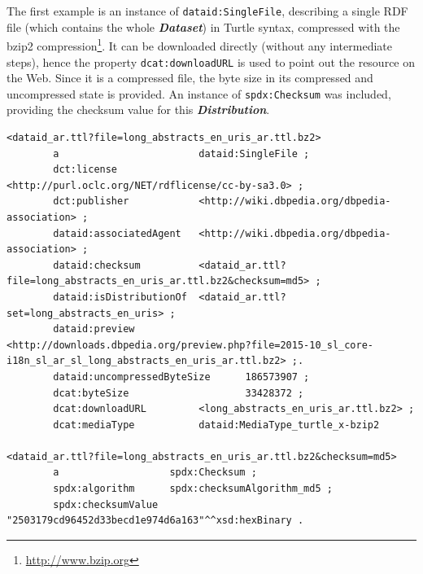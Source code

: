 \documentclass[a4paper,english,twoside,BCOR1.5cm,headsepline,DIV12,appendixprefix,final,12pt]{scrbook}
\newcommand{\prop}[1]{{{\texttt{#1}}}}
\newcommand{\important}[1]{\textbf{\textit{#1}}}
\newcommand\footnoteurl[1]{\footnote{\scriptsize\url{#1}}}
\begin{document}
The first example is an instance of \prop{dataid:SingleFile}, describing a single RDF file (which contains the whole \important{Dataset}) in Turtle syntax, compressed with the bzip2 compression\footnoteurl{http://www.bzip.org}. It can be downloaded directly (without any intermediate steps), hence the property \prop{dcat:downloadURL} is used to point out the resource on the Web. Since it is a compressed file, the byte size in its compressed and uncompressed state is provided. An instance of \prop{spdx:Checksum} was included, providing the checksum value for this \important{Distribution}.
\\
\begin{lstlisting}[language=ttl, captionpos=b,caption=A single file Distribution,label=lst:coresuperset,linewidth=\columnwidth,breaklines=true]
<dataid_ar.ttl?file=long_abstracts_en_uris_ar.ttl.bz2>
        a                        dataid:SingleFile ;
        dct:license              <http://purl.oclc.org/NET/rdflicense/cc-by-sa3.0> ;                              
        dct:publisher            <http://wiki.dbpedia.org/dbpedia-association> ;
        dataid:associatedAgent   <http://wiki.dbpedia.org/dbpedia-association> ;
        dataid:checksum          <dataid_ar.ttl?file=long_abstracts_en_uris_ar.ttl.bz2&checksum=md5> ;            
        dataid:isDistributionOf  <dataid_ar.ttl?set=long_abstracts_en_uris> ;                                     
        dataid:preview           <http://downloads.dbpedia.org/preview.php?file=2015-10_sl_core-i18n_sl_ar_sl_long_abstracts_en_uris_ar.ttl.bz2> ;.
        dataid:uncompressedByteSize      186573907 ;                                                              
        dcat:byteSize                    33428372 ;                                                               
        dcat:downloadURL         <long_abstracts_en_uris_ar.ttl.bz2> ;                                            
        dcat:mediaType           dataid:MediaType_turtle_x-bzip2                                                  

<dataid_ar.ttl?file=long_abstracts_en_uris_ar.ttl.bz2&checksum=md5>                                               
        a                   spdx:Checksum ;
        spdx:algorithm      spdx:checksumAlgorithm_md5 ;                                                          
        spdx:checksumValue  "2503179cd96452d33becd1e974d6a163"^^xsd:hexBinary .  
\end{lstlisting}
\end{document}

